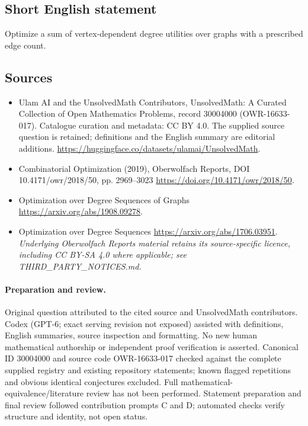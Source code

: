 \documentclass[11pt]{article}
\begin{document}
\subsection{Short English statement}
Optimize a sum of vertex-dependent degree utilities over graphs with a prescribed edge count.
\subsection{Sources}
\begin{itemize}
\item[\hypertarget{source:30004000:1}{S1}] Ulam AI and the UnsolvedMath Contributors, UnsolvedMath: A Curated Collection of Open Mathematics Problems, record 30004000 (OWR-16633-017). Catalogue curation and metadata: CC BY 4.0. The supplied source question is retained; definitions and the English summary are editorial additions.
\url{https://huggingface.co/datasets/ulamai/UnsolvedMath}.
\item[\hypertarget{source:30004000:2}{S2}] Combinatorial Optimization (2019), Oberwolfach Reports, DOI 10.4171/owr/2018/50, pp. 2969--3023
\url{https://doi.org/10.4171/owr/2018/50}.
\item[\hypertarget{source:30004000:3}{S3}] Optimization over Degree Sequences of Graphs
\url{https://arxiv.org/abs/1908.09278}.
\item[\hypertarget{source:30004000:4}{S4}] Optimization over Degree Sequences
\url{https://arxiv.org/abs/1706.03951}.
\textit{Underlying Oberwolfach Reports material retains its source-specific licence, including CC BY-SA 4.0 where applicable; see THIRD\_PARTY\_NOTICES.md.}
\end{itemize}
\paragraph{Preparation and review.}
Original question attributed to the cited source and UnsolvedMath contributors. Codex (GPT-6; exact serving revision not exposed) assisted with definitions, English summaries, source inspection and formatting. No new human mathematical authorship or independent proof verification is asserted. Canonical ID 30004000 and source code OWR-16633-017 checked against the complete supplied registry and existing repository statements; known flagged repetitions and obvious identical conjectures excluded. Full mathematical-equivalence/literature review has not been performed. Statement preparation and final review followed contribution prompts C and D; automated checks verify structure and identity, not open status.
\label{end:30004000}
\end{document}
